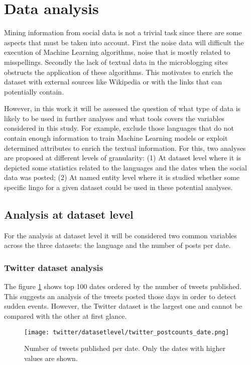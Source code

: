 \section{Data analysis}

Mining information from social data is not a trivial task since there are some aspects that must be taken into account. First the noise data will difficult the execution of Machine Learning algorithms, noise that is mostly related to misspellings. Secondly the lack of textual data in the microblogging sites obstructs the application of these algorithms. This motivates to enrich the dataset with external sources like Wikipedia \citep{paper:wikiEnrich} or with the links that can potentially contain.
\par However, in this work it will be assessed the question of what type of data is likely to be used in further analyses and what tools covers the variables considered in this study. For example, exclude those languages that do not contain enough information to train Machine Learning models or exploit determined attributes to enrich the textual information. For this, two analyses are proposed at different levels of granularity: (1) At dataset level where it is depicted some statistics related to the languages and the dates when the social data was posted; (2) At named entity level where it is studied whether some specific lingo for a given dataset could be used in these potential analyses.


\subsection{Analysis at dataset level}
For the analysis at dataset level it will be considered two common variables across the three datasets: the language and the number of posts per date.
\subsubsection{Twitter dataset analysis}
The figure \ref{fig:twitter_postcounts_date} shows top 100 dates ordered by the number of tweets published. This suggests an analysis of the tweets posted those days in order to detect sudden events.
However, the Twitter dataset is the largest one and cannot be compared with the other at first glance.
\begin{figure}[H]
	\begin{center}
		\texttt{[image: twitter/datasetlevel/twitter\_postcounts\_date.png]}
		\caption{Number of tweets published per date. Only the dates with higher values are shown.}
		\label{fig:twitter_postcounts_date}
	\end{center}
\end{figure}

